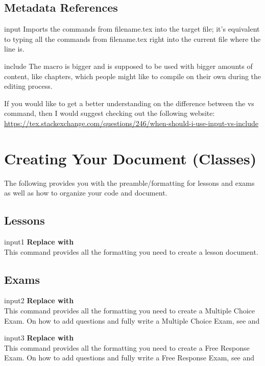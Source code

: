 \documentclass[12pt,hidelinks]{article}
\begin{document}
    \subsection{Metadata References}


	\begin{docCommand}{input}{}
		Imports the commands from filename.tex into the target file; it's equivalent to typing all the commands from filename.tex right into the current file where the  line is. 
	\end{docCommand}
	\begin{docCommand}{include}{}
		The  macro is bigger and is supposed to be used with bigger amounts of content, like chapters, which people might like to compile on their own during the editing process.
	\end{docCommand}
If you would like to get a better understanding on the difference between the  vs  command, then I would suggest checking out the following website:\\ 
\url{https://tex.stackexchange.com/questions/246/when-should-i-use-input-vs-include}\\
\newpage
\section{Creating Your Document (Classes)}
\vspace{10.5cm}
The following provides you with the preamble/formatting for lessons and exams as well as how to organize your code and document.
	\subsection{Lessons} 
		\begin{docCommand}{input1}{}
		        \textbf{Replace  with }\\
				This command provides all the formatting you need to create a lesson document.   
		\end{docCommand}
	\subsection{Exams}
		\begin{docCommand}{input2}{}
		        \textbf{Replace  with }\\
				This command provides all the formatting you need to create a Multiple Choice Exam. On how to add questions and fully write a Multiple Choice Exam, see  and 
		\end{docCommand}
		\begin{docCommand}{input3}{}
		        \textbf{Replace  with }\\
				This command provides all the formatting you need to create a Free Response Exam. On how to add questions and fully write a Free Response Exam, see  and 
		\end{docCommand}
\end{document}
